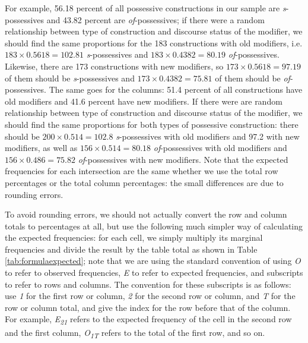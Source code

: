 For example, 56.18 percent of all possessive constructions in our sample are \textit{s}-possessives and 43.82 percent are \textit{of}-possessives; if there were a random relationship between type of construction and discourse status of the modifier, we should find the same proportions for the 183 constructions with old modifiers, i.e. $183 \times 0.5618 = 102.81$ \textit{s}-possessives and $183 \times 0.4382 = 80.19$ \textit{of}-possessives. Likewise, there are 173 constructions with new modifiers, so $173 \times 0.5618 = 97.19$ of them should be \textit{s}-possessives and $173 \times 0.4382 = 75.81$ of them should be \textit{of}-possessives. The same goes for the columns: 51.4 percent of all constructions have old modifiers and 41.6 percent have new modifiers. If there were are random relationship between type of construction and discourse status of the modifier, we should find the same proportions for both types of possessive construction: there should be $200 \times 0.514 = 102.8$ \textit{s}-possessives with old modifiers and 97.2 with new modifiers, as well as $156 \times 0.514 = 80.18$ \textit{of}-possessives with old modifiers and $156 \times 0.486 = 75.82$ \textit{of}-possessives with new modifiers. Note that the expected frequencies for each intersection are the same whether we use the total row percentages or the total column percentages: the small differences are due to rounding errors.

To avoid rounding errors, we should not actually convert the row and column totals to percentages at all, but use the following much simpler way of calculating the expected frequencies: for each cell, we simply multiply its marginal frequencies and divide the result by the table total as shown in Table \ref{tab:formulaexpected}; note that we are using the standard convention of using \textit{O} to refer to observed frequencies, \textit{E} to refer to expected frequencies, and subscripts to refer to rows and columns. The convention for these subscripts is as follows: use \textit{1} for the first row or column, \textit{2} for the second row or column, and \textit{T} for the row or column total, and give the index for the row before that of the column. For example, \textit{E}\textit{\textsubscript{21}} refers to the expected frequency of the cell in the second row and the first column, \textit{O}\textit{\textsubscript{1T}} refers to the total of the first row, and so on.

